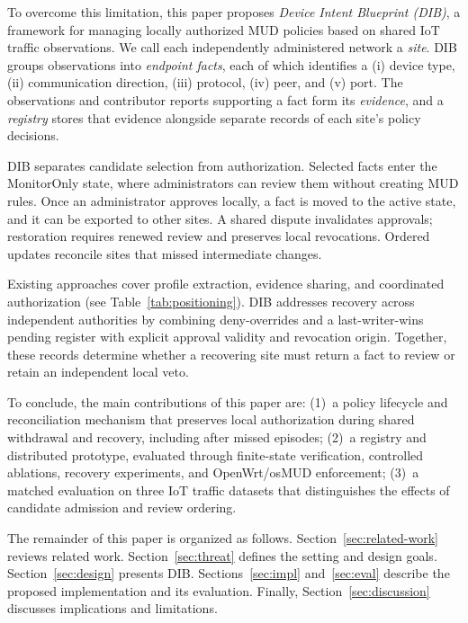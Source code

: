 \documentclass[journal]{IEEEtran}
\theoremstyle{definition}
\begin{document}
To overcome this limitation, this paper proposes \emph{Device Intent Blueprint (DIB)}, a framework for managing locally authorized MUD policies based on shared IoT traffic observations. We call each independently administered network a \emph{site}. DIB groups observations into \emph{endpoint facts}, each of which identifies a (i) device type, (ii) communication direction, (iii) protocol, (iv) peer, and (v) port. The observations and contributor reports supporting a fact form its \emph{evidence}, and a \emph{registry} stores that evidence alongside separate records of each site's policy decisions.

DIB separates candidate selection from authorization. Selected facts enter the MonitorOnly state, where administrators can review them without creating MUD rules.
Once an administrator approves locally, a fact is moved to the active state, and it can be exported to other sites. A shared dispute invalidates approvals; restoration requires renewed review and preserves local revocations. Ordered updates reconcile sites that missed intermediate changes.


Existing approaches cover profile extraction, evidence sharing, and coordinated authorization (see Table~\ref{tab:positioning}). DIB addresses recovery across independent authorities by combining deny-overrides and a last-writer-wins pending register with explicit approval validity and revocation origin. Together, these records determine whether a recovering site must return a fact to review or retain an independent local veto.

To conclude, the main contributions of this paper are:
(1)~a policy lifecycle and reconciliation mechanism that preserves local authorization during shared withdrawal and recovery, including after missed episodes;
(2)~a registry and distributed prototype, evaluated through finite-state verification, controlled ablations, recovery experiments, and OpenWrt/osMUD enforcement;
(3)~a matched evaluation on three IoT traffic datasets that distinguishes the effects of candidate admission and review ordering.


The remainder of this paper is organized as follows. Section~\ref{sec:related-work} reviews related work. Section~\ref{sec:threat} defines the setting and design goals. Section~\ref{sec:design} presents DIB. Sections~\ref{sec:impl} and~\ref{sec:eval} describe the proposed implementation and its evaluation. Finally, Section~\ref{sec:discussion} discusses implications and limitations.
\end{document}
